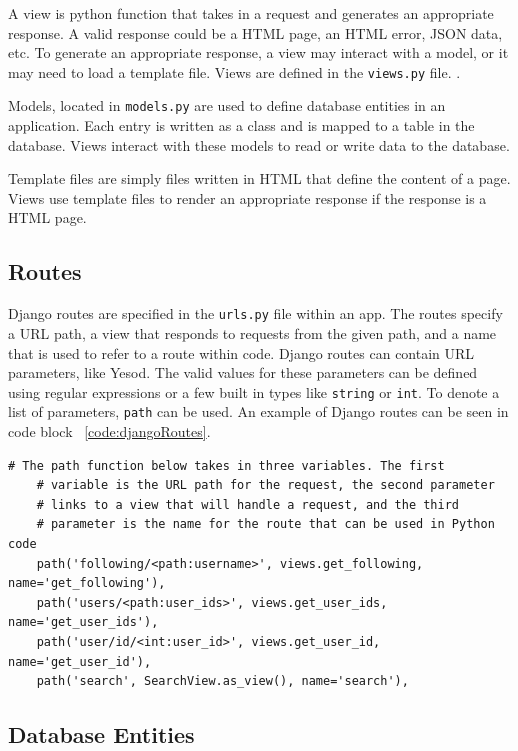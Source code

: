 A view is python function that takes in a request and generates an appropriate
response. A valid response could be a HTML page, an HTML error, JSON data, etc.
To generate an appropriate response, a view may interact with a model, or it
may need to load a template file. Views are defined in the \texttt{views.py}
file. \parencite{djangoViews}.

Models, located in \texttt{models.py} are used to define database entities
in an application. Each entry is written as a class and is mapped to a table
in the database. Views interact with these models to read or write data
to the database.

Template files are simply files written in HTML that define the content
of a page. Views use template files to render an appropriate response if
the response is a HTML page.

\subsection{Routes}

Django routes are specified in the \texttt{urls.py} file within an app. The routes
specify a URL path, a view that responds to requests from the given path, and a name
that is used to refer to a route within code. Django routes can contain URL parameters,
like Yesod. The valid values for these parameters can be defined using regular expressions
or a few built in types like \texttt{string} or \texttt{int}. To denote a list of parameters,
\texttt{path} can be used. An example of Django routes can be seen in code block ~\ref{code:djangoRoutes}.


\begin{lstlisting}[caption={An extract of Django routes},label={code:djangoRoutes}]
	# The path function below takes in three variables. The first
	# variable is the URL path for the request, the second parameter
	# links to a view that will handle a request, and the third
	# parameter is the name for the route that can be used in Python code
	path('following/<path:username>', views.get_following, name='get_following'),
	path('users/<path:user_ids>', views.get_user_ids, name='get_user_ids'),
	path('user/id/<int:user_id>', views.get_user_id, name='get_user_id'),
	path('search', SearchView.as_view(), name='search'),
\end{lstlisting}

\subsection{Database Entities}


